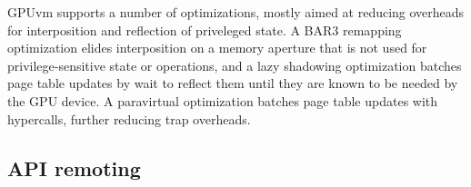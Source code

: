 \label{sec_gpuvm_opt}
GPUvm supports a number of optimizations, mostly aimed at reducing
overheads for interposition and reflection of priveleged state.
A BAR3 remapping optimization elides interposition on a memory aperture
that is not used for privilege-sensitive state or operations, and
a lazy shadowing optimization batches page table updates by wait to reflect them
until they are known to be needed by the GPU device. A paravirtual optimization
batches page table updates with hypercalls, further reducing trap overheads.




\subsection{API remoting} \label{sec:api-remote}


